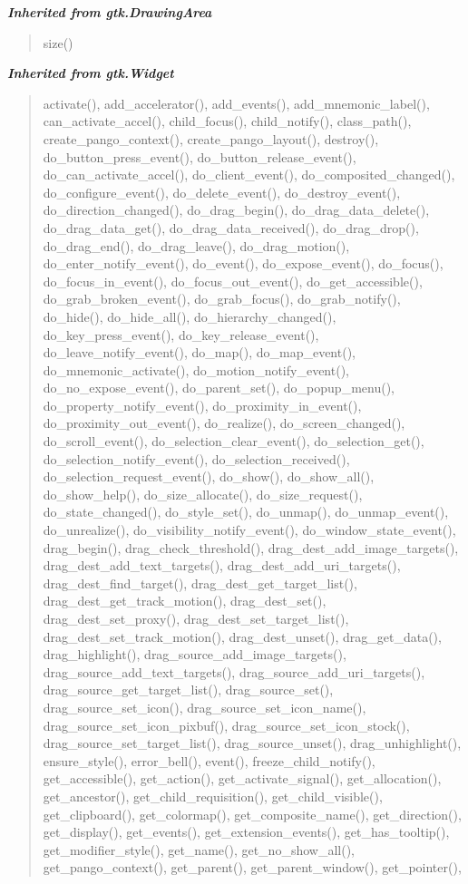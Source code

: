 \large{\textbf{\textit{Inherited from gtk.DrawingArea}}}

\begin{quote}
size()
\end{quote}

\large{\textbf{\textit{Inherited from gtk.Widget}}}

\begin{quote}
activate(), add\_accelerator(), add\_events(), add\_mnemonic\_label(), can\_activate\_accel(), child\_focus(), child\_notify(), class\_path(), create\_pango\_context(), create\_pango\_layout(), destroy(), do\_button\_press\_event(), do\_button\_release\_event(), do\_can\_activate\_accel(), do\_client\_event(), do\_composited\_changed(), do\_configure\_event(), do\_delete\_event(), do\_destroy\_event(), do\_direction\_changed(), do\_drag\_begin(), do\_drag\_data\_delete(), do\_drag\_data\_get(), do\_drag\_data\_received(), do\_drag\_drop(), do\_drag\_end(), do\_drag\_leave(), do\_drag\_motion(), do\_enter\_notify\_event(), do\_event(), do\_expose\_event(), do\_focus(), do\_focus\_in\_event(), do\_focus\_out\_event(), do\_get\_accessible(), do\_grab\_broken\_event(), do\_grab\_focus(), do\_grab\_notify(), do\_hide(), do\_hide\_all(), do\_hierarchy\_changed(), do\_key\_press\_event(), do\_key\_release\_event(), do\_leave\_notify\_event(), do\_map(), do\_map\_event(), do\_mnemonic\_activate(), do\_motion\_notify\_event(), do\_no\_expose\_event(), do\_parent\_set(), do\_popup\_menu(), do\_property\_notify\_event(), do\_proximity\_in\_event(), do\_proximity\_out\_event(), do\_realize(), do\_screen\_changed(), do\_scroll\_event(), do\_selection\_clear\_event(), do\_selection\_get(), do\_selection\_notify\_event(), do\_selection\_received(), do\_selection\_request\_event(), do\_show(), do\_show\_all(), do\_show\_help(), do\_size\_allocate(), do\_size\_request(), do\_state\_changed(), do\_style\_set(), do\_unmap(), do\_unmap\_event(), do\_unrealize(), do\_visibility\_notify\_event(), do\_window\_state\_event(), drag\_begin(), drag\_check\_threshold(), drag\_dest\_add\_image\_targets(), drag\_dest\_add\_text\_targets(), drag\_dest\_add\_uri\_targets(), drag\_dest\_find\_target(), drag\_dest\_get\_target\_list(), drag\_dest\_get\_track\_motion(), drag\_dest\_set(), drag\_dest\_set\_proxy(), drag\_dest\_set\_target\_list(), drag\_dest\_set\_track\_motion(), drag\_dest\_unset(), drag\_get\_data(), drag\_highlight(), drag\_source\_add\_image\_targets(), drag\_source\_add\_text\_targets(), drag\_source\_add\_uri\_targets(), drag\_source\_get\_target\_list(), drag\_source\_set(), drag\_source\_set\_icon(), drag\_source\_set\_icon\_name(), drag\_source\_set\_icon\_pixbuf(), drag\_source\_set\_icon\_stock(), drag\_source\_set\_target\_list(), drag\_source\_unset(), drag\_unhighlight(), ensure\_style(), error\_bell(), event(), freeze\_child\_notify(), get\_accessible(), get\_action(), get\_activate\_signal(), get\_allocation(), get\_ancestor(), get\_child\_requisition(), get\_child\_visible(), get\_clipboard(), get\_colormap(), get\_composite\_name(), get\_direction(), get\_display(), get\_events(), get\_extension\_events(), get\_has\_tooltip(), get\_modifier\_style(), get\_name(), get\_no\_show\_all(), get\_pango\_context(), get\_parent(), get\_parent\_window(), get\_pointer(), 
\end{quote}
